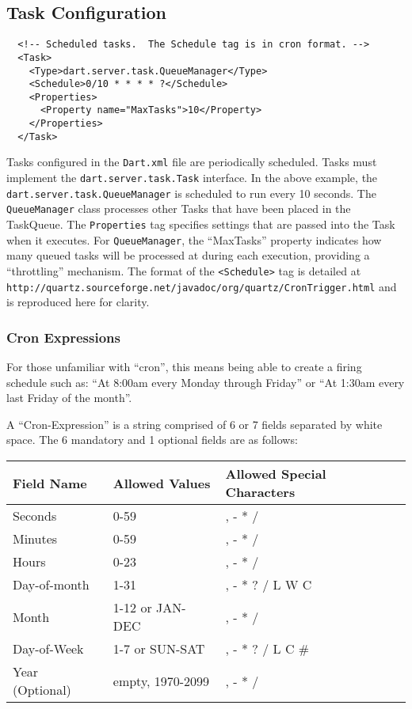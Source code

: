 \documentclass{InsightBook}
\newcommand{\xmltag}[1]{\texttt{<#1>}}
\newcommand{\filename}[1]{\texttt{#1}}
\begin{document}
\subsection{Task Configuration}
\label{Section:TaskConfiguration}
\begin{verbatim}
  <!-- Scheduled tasks.  The Schedule tag is in cron format. -->
  <Task>
    <Type>dart.server.task.QueueManager</Type>
    <Schedule>0/10 * * * * ?</Schedule>
    <Properties>
      <Property name="MaxTasks">10</Property>
    </Properties>
  </Task>
\end{verbatim}

Tasks configured in the \filename{Dart.xml} file are periodically
scheduled.  Tasks must implement the \texttt{dart.server.task.Task}
interface.  In the above example, the
\texttt{dart.server.task.QueueManager} is scheduled to run every 10
seconds.  The \texttt{QueueManager} class processes other Tasks that have been
placed in the TaskQueue.  The \texttt{Properties} tag specifies
settings that are passed into the Task when it executes.  For
\texttt{QueueManager}, the ``MaxTasks'' property indicates how many
queued tasks will be processed at during each execution, providing a
``throttling'' mechanism.  The format of the \xmltag{Schedule} tag
is detailed at
\texttt{http://quartz.sourceforge.net/javadoc/org/quartz/CronTrigger.html}
and is reproduced here for clarity.

\subsubsection{Cron Expressions}
 For those unfamiliar with ``cron'', this means being able to create a firing schedule such as: ``At 8:00am every Monday through Friday'' or ``At 1:30am every last Friday of the month''.

A ``Cron-Expression'' is a string comprised of 6 or 7 fields separated
by white space. The 6 mandatory and 1 optional fields are as follows:

\begin{tabular}{lll}
Field Name &            Allowed Values &                Allowed Special Characters \\
\hline
Seconds &               0-59 &          , - * /   \\ 
Minutes&                0-59&           , - * / \\
Hours&          0-23&           , - * / \\
Day-of-month&           1-31&           , - * ? / L W C \\
Month&          1-12 or JAN-DEC&                , - * / \\
Day-of-Week&            1-7 or SUN-SAT&                 , - * ? / L C \# \\
Year (Optional)&                empty, 1970-2099&               , - * / \\
\end{tabular}
\end{document}
